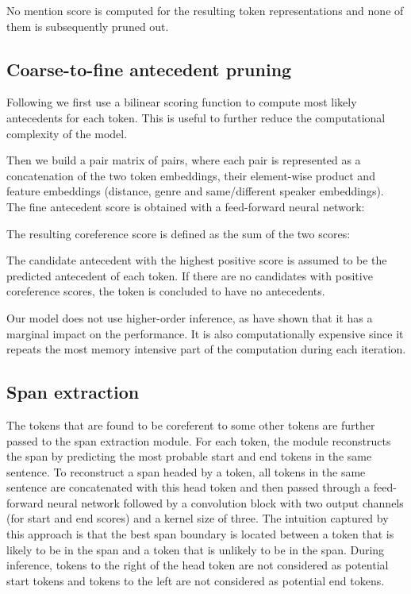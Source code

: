 \documentclass[11pt]{article}
\begin{document}
No mention score is computed for the resulting token representations and none of them is subsequently pruned out.

\subsection{Coarse-to-fine antecedent pruning}
Following \citet{lee-etal-2018-higher} we first use a bilinear scoring function to compute  most likely antecedents for each token. This is useful to further reduce the computational complexity of the model.

Then we build a pair matrix of  pairs, where each pair is represented as a concatenation of the two token embeddings, their element-wise product and feature embeddings (distance, genre and same/different speaker embeddings). The fine antecedent score is obtained with a feed-forward neural network:

The resulting coreference score is defined as the sum of the two scores:

The candidate antecedent with the highest positive score is assumed to be the predicted antecedent of each token. If there are no candidates with positive coreference scores, the token is concluded to have no antecedents.

Our model does not use higher-order inference, as \citet{xu-choi-2020-revealing} have shown that it has a marginal impact on the performance. It is also computationally expensive since it repeats the most memory intensive part of the computation during each iteration.

\subsection{Span extraction}
The tokens that are found to be coreferent to some other tokens are further passed to the span extraction module. For each token, the module reconstructs the span by predicting the most probable start and end tokens in the same sentence. To reconstruct a span headed by a token, all tokens in the same sentence are concatenated with this head token and then passed through a feed-forward neural network followed by a convolution block with two output channels (for start and end scores) and a kernel size of three. The intuition captured by this approach is that the best span boundary is located between a token that is likely to be in the span and a token that is unlikely to be in the span. During inference, tokens to the right of the head token are not considered as potential start tokens and tokens to the left are not considered as potential end tokens.
\end{document}
